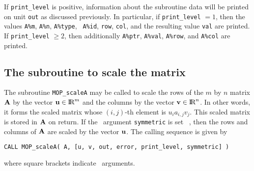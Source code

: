 \documentclass{galahad}
\newcommand{\packagename}{MOP}
\begin{document}
If {\tt print\_level} is positive, information about the subroutine
data will be printed on unit {\tt out} as discussed
previously.  In particular, if {\tt print\_level} $= 1$, then the
values {\tt A\%m}, {\tt A\%n}, {\tt A\%type}, {\tt
  A\%id}, {\tt row}, {\tt col}, and the resulting value {\tt val} are
printed.  If {\tt print\_level} $\geq 2$, then
additionally {\tt A\%ptr}, {\tt A\%val}, {\tt A\%row},
and {\tt A\%col} are printed.


\subsection{The subroutine to scale the matrix}\label{scaleA}

The subroutine {\tt \packagename\_scaleA} may be called to scale the
rows of the $m$ by $n$ matrix ${\mathbf{A}}$ by the vector ${\mathbf{u}}\in\hbox{I\hskip -1.5pt R}^m$
and the columns by the vector ${\mathbf{v}}\in\hbox{I\hskip -1.5pt R}^n$.  In other words, it
forms the scaled matrix whose $(i,j)$-th element is $u_ia_{i,j}v_j$.
This scaled matrix is stored in ${\mathbf{A}}$ on return.  If the \optional\
argument {\tt symmetric} is set \true\ , then the rows and columns of
${\mathbf{A}}$ are scaled by the vector ${\mathbf{u}}$.  The calling
sequence is given by \vspace*{1mm}

\hspace{8mm}
{\tt CALL \packagename\_scaleA( A, [u, v, out, error,
                                print\_level, symmetric] )}

\vspace*{1mm}
\noindent where square brackets indicate \optional\ arguments.
\end{document}

